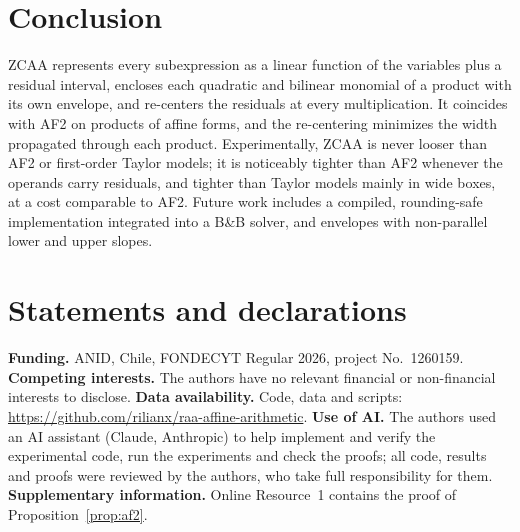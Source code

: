 \documentclass[10pt]{article}
\begin{document}
\section{Conclusion}

ZCAA represents every subexpression as a linear function of the variables plus a residual interval, encloses each quadratic and bilinear monomial of a product with its own envelope, and re-centers the residuals at every multiplication. It coincides with AF2 on products of affine forms, and the re-centering minimizes the width propagated through each product. Experimentally, ZCAA is never looser than AF2 or first-order Taylor models; it is noticeably tighter than AF2 whenever the operands carry residuals, and tighter than Taylor models mainly in wide boxes, at a cost comparable to AF2. Future work includes a compiled, rounding-safe implementation integrated into a B\&B solver, and envelopes with non-parallel lower and upper slopes.

\section*{Statements and declarations}
\textbf{Funding.} ANID, Chile, FONDECYT Regular 2026, project No.~1260159.
\textbf{Competing interests.} The authors have no relevant financial or non-financial interests to disclose.
\textbf{Data availability.} Code, data and scripts: \url{https://github.com/rilianx/raa-affine-arithmetic}.
\textbf{Use of AI.} The authors used an AI assistant (Claude, Anthropic) to help implement and verify the experimental code, run the experiments and check the proofs; all code, results and proofs were reviewed by the authors, who take full responsibility for them.
\textbf{Supplementary information.} Online Resource~1 contains the proof of Proposition~\ref{prop:af2}.



\end{document}
